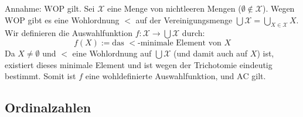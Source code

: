 \begin{math-stroke}

\begin{short-proof}
Annahme: $\text{WOP}$ gilt.
Sei $\mathcal{X}$ eine Menge von nichtleeren Mengen ($\emptyset \notin \mathcal{X}$).
Wegen $\text{WOP}$ gibt es eine Wohlordnung $<$ auf der Vereinigungsmenge $\bigcup \mathcal{X} = \bigcup_{X \in \mathcal{X}} X$.
Wir definieren die Auswahlfunktion $f: \mathcal{X} \to \bigcup \mathcal{X}$ durch:
\[
f(X) := \text{das } <\text{-minimale Element von } X
\]
Da $X \neq \emptyset$ und $<$ eine Wohlordnung auf $\bigcup \mathcal{X}$ (und damit auch auf $X$) ist, existiert dieses minimale Element und ist wegen der Trichotomie eindeutig bestimmt. Somit ist $f$ eine wohldefinierte Auswahlfunktion, und $\text{AC}$ gilt.
\end{short-proof}
\end{math-stroke}

\subsection{Ordinalzahlen}

